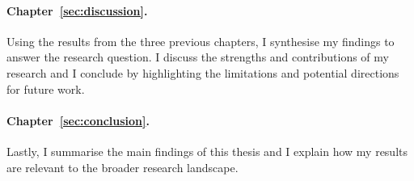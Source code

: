 \paragraph{Chapter~\ref{sec:discussion}.} Using the results from the three previous chapters, I synthesise my findings to answer the research question. I discuss the strengths and contributions of my research and I conclude by highlighting the limitations and potential directions for future work.

\paragraph{Chapter~\ref{sec:conclusion}.} Lastly, I summarise the main findings of this thesis and I explain how my results are relevant to the broader research landscape.